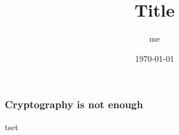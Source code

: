 \documentclass[aspectratio=169]{beamer}
\title{Title }
\date{\today}
\author{me}
\begin{document}
\begin{frame}[plain]
  \titlepage
\end{frame}

\begin{frame}
  \frametitle{Cryptography is not enough}
  tset
\end{frame}
\end{document}
